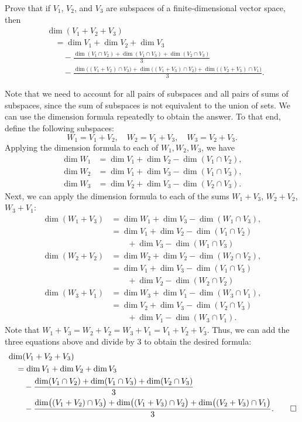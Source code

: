 \begin{exercise}
Prove that if $V_1$, $V_2$, and $V_3$ are subspaces of a finite-dimensional
vector space, then
\begin{align*}
&\dim(V_1+V_2+V_3)\\
&\quad= \dim V_1+\dim V_2+\dim V_3\\
&\qquad-\frac{\dim(V_1\cap V_2)+\dim(V_1\cap V_3)+\dim(V_2\cap V_3)}{3}\\
&\qquad-\frac{\dim\bigl((V_1+V_2)\cap V_3\bigr)+\dim\bigl((V_1+V_3)\cap V_2\bigr)
  +\dim\bigl((V_2+V_3)\cap V_1\bigr)}{3}.
\end{align*}
\end{exercise}
\begin{solution}
Note that we need to account for all pairs of subspaces and all pairs of sums of
subspaces, since the sum of subspaces is not equivalent to the union of sets. We
can use the dimension formula repeatedly to obtain the answer. To that end,
define the following subspaces:
\[ W_1=V_1+V_2, \quad W_2=V_1+V_3, \quad W_3=V_2+V_3. \]
Applying the dimension formula to each of $W_1,W_2,W_3$, we have
\begin{align*}
\dim W_1 &= \dim V_1+\dim V_2-\dim(V_1\cap V_2),\\
\dim W_2 &= \dim V_1+\dim V_3-\dim(V_1\cap V_3),\\
\dim W_3 &= \dim V_2+\dim V_3-\dim(V_2\cap V_3).
\end{align*}
Next, we can apply the dimension formula to each of the sums $W_1+V_3$,
$W_2+V_2$, $W_3+V_1$:
\begin{align*}
\dim(W_1+V_3) &= \dim W_1+\dim V_3-\dim(W_1\cap V_3),\\
  &= \dim V_1+\dim V_2-\dim(V_1\cap V_2)\\
  &\qquad+\dim V_3-\dim(W_1\cap V_3)\\
\dim(W_2+V_2) &= \dim W_2+\dim V_2-\dim(W_2\cap V_2),\\
  &= \dim V_1+\dim V_3-\dim(V_1\cap V_3)\\
  &\qquad+\dim V_2-\dim(W_2\cap V_2)\\
\dim(W_3+V_1) &= \dim W_3+\dim V_1-\dim(W_3\cap V_1),\\
  &= \dim V_2+\dim V_3-\dim(V_2\cap V_3)\\
  &\qquad+\dim V_1-\dim(W_3\cap V_1).
\end{align*}
Note that $W_1+V_3=W_2+V_2=W_3+V_1=V_1+V_2+V_3$. Thus, we can add the three
equations above and divide by $3$ to obtain the desired formula:
\begin{align*}
&\dim(V_1+V_2+V_3)\\
&\quad= \dim V_1+\dim V_2+\dim V_3\\
&\qquad-\frac{\dim(V_1\cap V_2)+\dim(V_1\cap V_3)+\dim(V_2\cap V_3)}{3}\\
&\qquad-\frac{\dim\bigl((V_1+V_2)\cap V_3\bigr)+\dim\bigl((V_1+V_3)\cap V_2\bigr)
  +\dim\bigl((V_2+V_3)\cap V_1\bigr)}{3}. \qedhere
\end{align*}
\end{solution}

